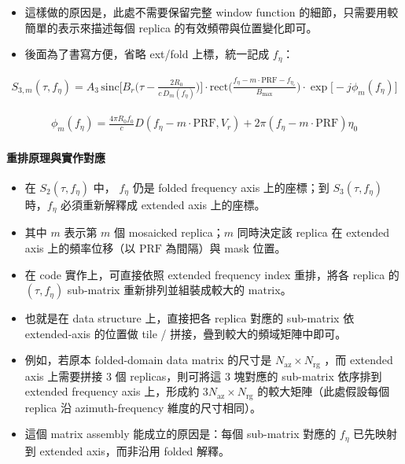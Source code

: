 \documentclass[11pt]{article}
\begin{document}
\begin{itemize}
\item
  這樣做的原因是，此處不需要保留完整 window function
  的細節，只需要用較簡單的表示來描述每個 replica
  的有效頻帶與位置變化即可。
\item
  後面為了書寫方便，省略 ext/fold 上標，統一記成 \(f_\eta\)：
\end{itemize}

\begin{equation}
\begin{aligned}
S_{3,m}(\tau,f_\eta)=A_3\,
\mathrm{sinc}\biggl[B_r\biggl(\tau-\frac{2R_0}{c\,D_m(f_\eta)}\biggr)\biggr]\cdot
\mathrm{rect}\biggl(\frac{f_\eta-m\cdot\mathrm{PRF}-f_{\eta_c}}{B_{\max}}\biggr)\cdot
\exp\biggl[-j\phi_m(f_\eta)\biggr]
\end{aligned}
\end{equation}

\begin{equation}
\begin{aligned}
\phi_m(f_\eta)=\frac{4\pi R_0f_0}{c}D(f_\eta-m\cdot\mathrm{PRF},V_r)+2\pi(f_\eta-m\cdot\mathrm{PRF})\eta_0
\end{aligned}
\end{equation}

\hypertarget{ux91cdux6392ux539fux7406ux8207ux5be6ux4f5cux5c0dux61c9}{%
\paragraph{重排原理與實作對應}\label{ux91cdux6392ux539fux7406ux8207ux5be6ux4f5cux5c0dux61c9}}

\begin{itemize}
\item
  在 \(S_2(\tau,f_\eta)\) 中， \(f_\eta\) 仍是 folded frequency axis
  上的座標；到 \(S_3(\tau,f_\eta)\) 時，\(f_\eta\) 必須重新解釋成
  extended axis 上的座標。
\item
  其中 \(m\) 表示第 \(m\) 個 mosaicked replica；\(m\) 同時決定該 replica
  在 extended axis 上的頻率位移（以 \(\mathrm{PRF}\) 為間隔）與 mask
  位置。
\item
  在 code 實作上，可直接依照 extended frequency index 重排，將各 replica
  的 \((\tau,f_\eta)\) sub-matrix 重新排列並組裝成較大的 matrix。
\item
  也就是在 data structure 上，直接把各 replica 對應的 sub-matrix 依
  extended-axis 的位置做 tile / 拼接，疊到較大的頻域矩陣中即可。
\item
  例如，若原本 folded-domain data matrix 的尺寸是
  \(N_{\mathrm{az}}\times N_{\mathrm{rg}}\) ，而 extended axis
  上需要拼接 3 個 replicas，則可將這 3 塊對應的 sub-matrix 依序排到
  extended frequency axis 上，形成約
  \(3N_{\mathrm{az}}\times N_{\mathrm{rg}}\) 的較大矩陣（此處假設每個
  replica 沿 azimuth-frequency 維度的尺寸相同）。
\item
  這個 matrix assembly 能成立的原因是：每個 sub-matrix 對應的 \(f_\eta\)
  已先映射到 extended axis，而非沿用 folded 解釋。
\end{itemize}
\end{document}
